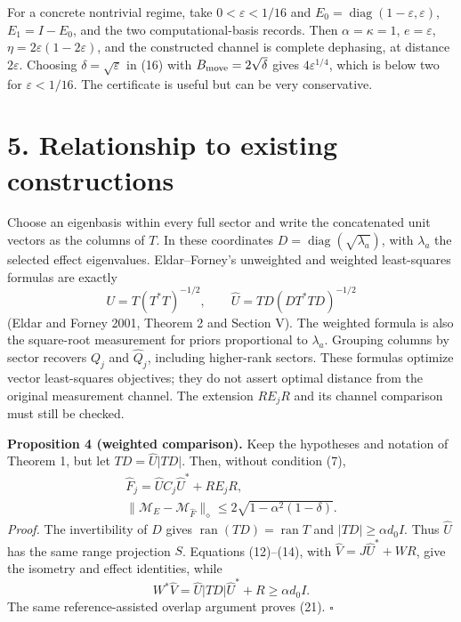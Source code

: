 \documentclass[
  11pt,
  a4paper,
]{article}
\begin{document}
For a concrete nontrivial regime, take \(0<\varepsilon<1/16\) and
\(E_0=\operatorname{diag}(1-\varepsilon,\varepsilon)\), \(E_1=I-E_0\),
and the two computational-basis records. Then \(\alpha=\kappa=1\),
\(e=\varepsilon\), \(\eta=2\varepsilon(1-2\varepsilon)\), and the
constructed channel is complete dephasing, at distance \(2\varepsilon\).
Choosing \(\delta=\sqrt\varepsilon\) in (16) with
\(B_{\rm move}=2\sqrt\delta\) gives \(4\varepsilon^{1/4}\), which is
below two for \(\varepsilon<1/16\). The certificate is useful but can be
very conservative.

\section{5. Relationship to existing
constructions}\label{relationship-to-existing-constructions}

Choose an eigenbasis within every full sector and write the concatenated
unit vectors as the columns of \(T\). In these coordinates
\(D=\operatorname{diag}(\sqrt{\lambda_a})\), with \(\lambda_a\) the
selected effect eigenvalues. Eldar--Forney's unweighted and weighted
least-squares formulas are exactly \[U=T(T^*T)^{-1/2},\qquad
\widehat U=TD(DT^*TD)^{-1/2}\] (Eldar and Forney 2001, Theorem 2 and
Section V). The weighted formula is also the square-root measurement for
priors proportional to \(\lambda_a\). Grouping columns by sector
recovers \(Q_j\) and \(\widehat Q_j\), including higher-rank sectors.
These formulas optimize vector least-squares objectives; they do not
assert optimal distance from the original measurement channel. The
extension \(RE_jR\) and its channel comparison must still be checked.

\textbf{Proposition 4 (weighted comparison).} Keep the hypotheses and
notation of Theorem 1, but let \(TD=\widehat U|TD|\). Then, without
condition (7), \[\begin{gathered}
\widehat F_j=\widehat UC_j\widehat U^*+RE_jR,\\
\|\mathcal M_E-\mathcal M_{\widehat F}\|_\diamond
\le2\sqrt{1-\alpha^2(1-\delta)}.
\end{gathered}
\tag{21}\] \emph{Proof.} The invertibility of \(D\) gives
\(\operatorname{ran}(TD)=\operatorname{ran}T\) and
\(|TD|\ge\alpha d_0I\). Thus \(\widehat U\) has the same range
projection \(S\). Equations (12)--(14), with
\(\widehat V=J\widehat U^*+WR\), give the isometry and effect
identities, while
\[W^*\widehat V=\widehat U|TD|\widehat U^*+R\ge\alpha d_0I.\] The same
reference-assisted overlap argument proves (21). \(\square\)
\end{document}
